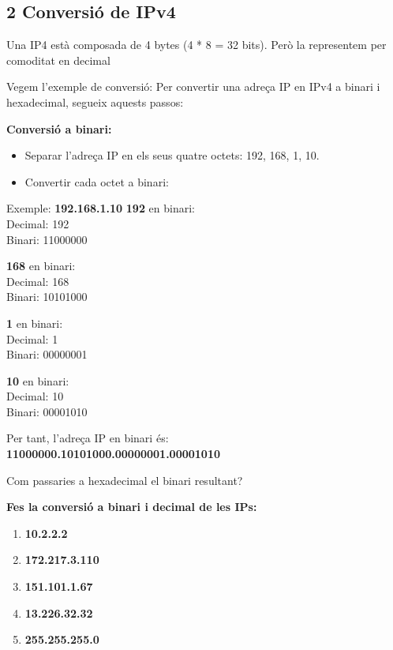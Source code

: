 \documentclass[
  12 pt,
  a4paper,
]{article}
\providecommand{\tightlist}{%
  \setlength{\itemsep}{0pt}\setlength{\parskip}{0pt}}
\begin{document}
\subsection{2 Conversió de IPv4}\label{conversiuxf3-de-ipv4}

Una IP4 està composada de 4 bytes (4 * 8 = 32 bits). Però la representem
per comoditat en decimal

Vegem l'exemple de conversió: Per convertir una adreça IP en IPv4 a
binari i hexadecimal, segueix aquests passos:

\textbf{Conversió a binari:}

\begin{itemize}
\tightlist
\item
  Separar l'adreça IP en els seus quatre octets: 192, 168, 1, 10.
\item
  Convertir cada octet a binari:
\end{itemize}

Exemple: \textbf{192.168.1.10} \textbf{192} en binari:\\
Decimal: 192\\
Binari: 11000000

\textbf{168} en binari:\\
Decimal: 168\\
Binari: 10101000

\textbf{1} en binari:\\
Decimal: 1\\
Binari: 00000001

\textbf{10} en binari:\\
Decimal: 10\\
Binari: 00001010

Per tant, l'adreça IP en binari és:\\
\textbf{11000000.10101000.00000001.00001010}

Com passaries a hexadecimal el binari resultant?

\textbf{Fes la conversió a binari i decimal de les IPs:}

\begin{enumerate}
\def\labelenumi{\arabic{enumi}.}
\item
  \textbf{10.2.2.2}
\item
  \textbf{172.217.3.110}
\item
  \textbf{151.101.1.67}
\item
  \textbf{13.226.32.32}
\item
  \textbf{255.255.255.0}
\end{enumerate}
\end{document}
